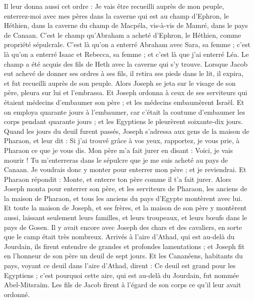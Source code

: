 \begin{multicols}{2}
Il leur donna aussi cet ordre : Je vais être recueilli auprès de mon peuple, enterrez-moi avec mes pères dans la caverne qui est au champ d'Ephron, le Héthien,
dans la caverne du champ de Macpéla, vis-à-vis de Mamré, dans le pays de Canaan. C'est le champ qu'Abraham a acheté d'Ephron, le Héthien, comme propriété sépulcrale.
C'est là qu'on a enterré Abraham avec Sara, sa femme ; c'est là qu'on a enterré Isaac et Rebecca, sa femme ; et c'est là que j'ai enterré Léa.
Le champ a été acquis des fils de Heth avec la caverne qui s'y trouve.
Lorsque Jacob eut achevé de donner ses ordres à ses fils, il retira ses pieds dans le lit, il expira, et fut recueilli auprès de son peuple.
\VerseOne{}Alors Joseph se jeta sur le visage de son père, pleura sur lui et l'embrassa.
Et Joseph ordonna à ceux de ses serviteurs qui étaient médecins d'embaumer son père ; et les médecins embaumèrent Israël.
Et on employa quarante jours à l'embaumer, car c'était la coutume d'embaumer les corps pendant quarante jours ; et les Egyptiens le pleurèrent soixante-dix jours.
Quand les jours du deuil furent passés, Joseph s'adressa aux gens de la maison de Pharaon, et leur dit : Si j'ai trouvé grâce à vos yeux, rapportez, je vous prie, à Pharaon ce que je vous dis.
Mon père m'a fait jurer en disant : Voici, je vais mourir ! Tu m'enterreras dans le sépulcre que je me suis acheté au pays de Canaan. Je voudrais donc y monter pour enterrer mon père ; et je reviendrai.
Et Pharaon répondit : Monte, et enterre ton père comme il t'a fait jurer.
Alors Joseph monta pour enterrer son père, et les serviteurs de Pharaon, les anciens de la maison de Pharaon, et tous les anciens du pays d'Egypte montèrent avec lui.
Et toute la maison de Joseph, et ses frères, et la maison de son père y montèrent aussi, laissant seulement leurs familles, et leurs troupeaux, et leurs bœufs dans le pays de Gosen.
Il y avait encore avec Joseph des chars et des cavaliers, en sorte que le camp était très nombreux.
Arrivés à l'aire d'Athad, qui est au-delà du Jourdain, ils firent entendre de grandes et profondes lamentations ; et Joseph fit en l'honneur de son père un deuil de sept jours.
Et les Cananéens, habitants du pays, voyant ce deuil dans l'aire d'Athad, dirent : Ce deuil est grand pour les Egyptiens ; c'est pourquoi cette aire, qui est au-delà du Jourdain, fut nommée Abel-Mitsraïm.
Les fils de Jacob firent à l'égard de son corps ce qu'il leur avait ordonné.

\end{multicols}
